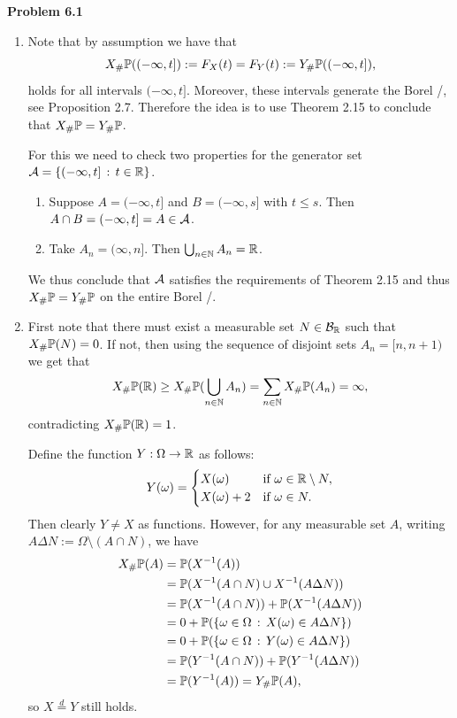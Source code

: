 
\textbf{Problem 6.1}

\begin{enumerate}[label=(\alph*)]
\item Note that by assumption we have that
\[
	X_\# \mathbb P((-\infty, t]) := F_X(t) = F_Y(t) := Y_\# \mathbb P((-\infty, t]),
\]
holds for all intervals $(-\infty, t]$. Moreover, these intervals generate the Borel \sigalg/, see Proposition 2.7. Therefore the idea is to use Theorem 2.15 to conclude that $X_\# \mathbb P = Y_\# \mathbb P$.

For this we need to check two properties for the generator set $\mathcal A = \{(-\infty, t] \, : \, t \in \mathbb R\}$.
\begin{enumerate}[label=\arabic*.]
\item Suppose $A = (-\infty, t]$ and $B = (-\infty, s]$ with $t \le s$. Then $A \cap B = (-\infty, t] = A \in \mathcal A$.
\item Take $A_n = (\infty,n]$. Then $\bigcup_{n \in \mathbb N} A_n = \mathbb R$.
\end{enumerate}

We thus conclude that $\mathcal A$ satisfies the requirements of Theorem 2.15 and thus $X_\# \mathbb P = Y_\# \mathbb P$ on the entire Borel \sigalg/.
\item First note that there must exist a measurable set $N \in \mathcal B_{\mathbb R}$ such that $X_\# \mathbb P(N) = 0$. If not, then using the sequence of disjoint sets $A_n = [n,n+1)$ we get that
\[
	X_\# \mathbb P(\mathbb R) \ge X_\# \mathbb P(\bigcup_{n \in \mathbb N} A_n) = \sum_{n \in \mathbb N} X_\#\mathbb P(A_n) = \infty,
\]
contradicting $X_\# \mathbb P(\mathbb R) = 1$.

Define the function $Y : \Omega \to \mathbb R$ as follows:
\[
	Y(\omega) = \begin{cases}
		X(\omega) &\text{if } \omega \in \mathbb R \setminus N,\\
		X(\omega) + 2 &\text{if } \omega \in N.
	\end{cases}
\]
Then clearly $Y \ne X$ as functions. However, for any measurable set $A$, writing $A \Delta N := \Omega \setminus (A \cap N)$, we have
\begin{align*}
	X_\# \mathbb P(A) &= \mathbb P(X^{-1}(A)) \\
	&= \mathbb P(X^{-1}(A\cap N) \cup X^{-1}(A \Delta N)) \\
	&= \mathbb P(X^{-1}(A \cap N)) + \mathbb P(X^{-1}(A \Delta N))\\
	&= 0 + \mathbb P(\{\omega \in \Omega \, : \, X(\omega) \in A \Delta N\}) \\
	&= 0 + \mathbb P(\{\omega \in \Omega \, : \, Y(\omega) \in A \Delta N\}) \\
	&= \mathbb P(Y^{-1}(A \cap N)) + \mathbb P(Y^{-1}(A \Delta N))\\
	&= \mathbb P(Y^{-1}(A)) = Y_\# \mathbb P(A),
\end{align*}
so $X \stackrel{d}{=} Y$ still holds.
\end{enumerate}

